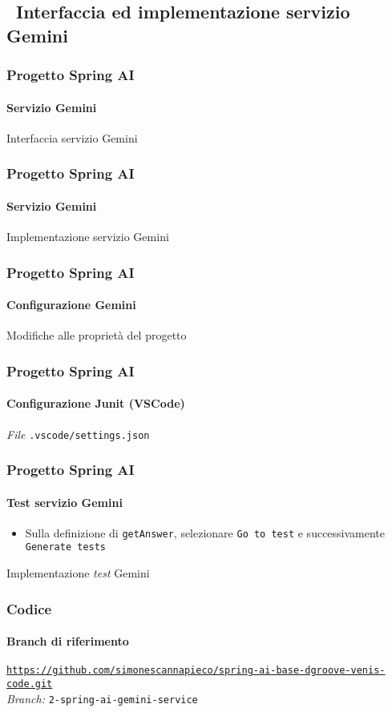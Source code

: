 \subsection{\faWrench\ Interfaccia ed implementazione servizio Gemini} %
\label{subsec:spring-ai-gemini-service-code}
%
\begin{frame}[t,fragile] \frametitle{Progetto Spring AI}
    \framesubtitle{Servizio Gemini}
        \begin{block}{Interfaccia servizio Gemini}
{\tiny}
    \end{block}
\end{frame}
%
\begin{frame}[t,fragile] \frametitle{Progetto Spring AI}
    \framesubtitle{Servizio Gemini}
        \begin{block}{Implementazione servizio Gemini}
{\tiny}
    \end{block}
\end{frame}
%
\begin{frame}[t,fragile] \frametitle{Progetto Spring AI}
    \framesubtitle{Configurazione Gemini}
        \begin{block}{Modifiche alle proprietà del progetto}
{\tiny}
    \end{block}
\end{frame}
%
\begin{frame}[t,fragile] \frametitle{Progetto Spring AI}
    \framesubtitle{Configurazione Junit (VSCode)}
        \begin{block}{\textit{File} \texttt{.vscode/settings.json}}
{\tiny}
    \end{block}
\end{frame}
%
\begin{frame}[t,fragile] \frametitle{Progetto Spring AI}
    \framesubtitle{Test servizio Gemini}
    \begin{itemize}
        \item[\alertedcircled{1}] Sulla definizione di \texttt{getAnswer}, selezionare \texttt{Go to test} e successivamente \texttt{Generate tests}
    \end{itemize}
        \begin{block}{Implementazione \textit{test} Gemini}
{\tiny}
    \end{block}
\end{frame}
%
\begin{frame}[fragile] \frametitle{Codice}
    \framesubtitle{Branch di riferimento}
	\begin{center}
		{\scriptsize \href{https://github.com/simonescannapieco/spring-ai-base-dgroove-venis-code.git}{\texttt{https://github.com/simonescannapieco/spring-ai-base-dgroove-venis-code.git}}}\\
		\textit{Branch:} \alert{\texttt{2-spring-ai-gemini-service}}
	\end{center}
\end{frame}